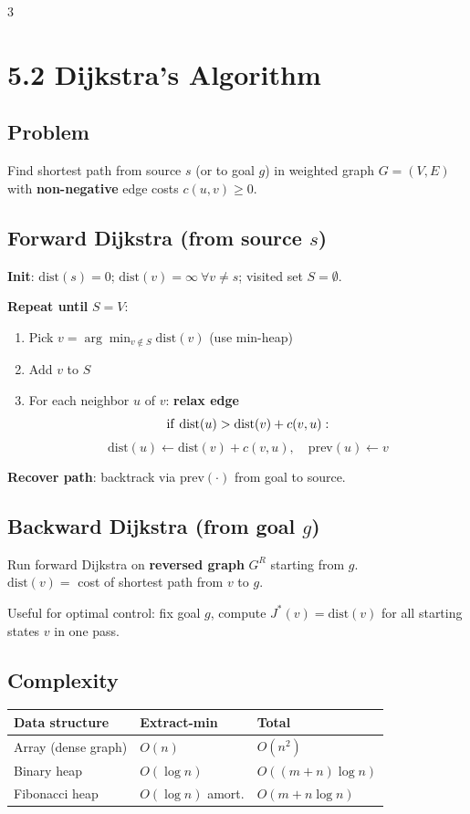 \documentclass[9pt,landscape]{article}
\begin{document}
\begin{multicols}{3}
\section{5.2 Dijkstra's Algorithm}

\subsection{Problem}
Find shortest path from source $s$ (or to goal $g$) in weighted graph $G=(V,E)$ with \textbf{non-negative} edge costs $c(u,v)\ge0$.

\subsection{Forward Dijkstra (from source $s$)}
\textbf{Init}: $\mathrm{dist}(s)=0$; $\mathrm{dist}(v)=\infty\ \forall v\ne s$; visited set $S=\emptyset$.

\textbf{Repeat until} $S=V$:
\begin{enumerate}
  \item Pick $v=\arg\min_{v\notin S}\mathrm{dist}(v)$ \quad (use min-heap)
  \item Add $v$ to $S$
  \item For each neighbor $u$ of $v$: \textbf{relax edge}
  \[{\rm if}\ \mathrm{dist}(u)>\mathrm{dist}(v)+c(v,u):\]
  \[\mathrm{dist}(u)\leftarrow\mathrm{dist}(v)+c(v,u),\quad \mathrm{prev}(u)\leftarrow v\]
\end{enumerate}
\textbf{Recover path}: backtrack via $\mathrm{prev}(\cdot)$ from goal to source.

\subsection{Backward Dijkstra (from goal $g$)}
Run forward Dijkstra on \textbf{reversed graph} $G^R$ starting from $g$.\\
$\mathrm{dist}(v)=$ cost of shortest path from $v$ to $g$.

Useful for optimal control: fix goal $g$, compute $J^*(v)=\mathrm{dist}(v)$ for all starting states $v$ in one pass.

\subsection{Complexity}
\begin{tabular}{@{}lll@{}}
\toprule
\textbf{Data structure} & \textbf{Extract-min} & \textbf{Total}\\
\midrule
Array (dense graph) & $O(n)$ & $O(n^2)$\\
Binary heap & $O(\log n)$ & $O((m+n)\log n)$\\
Fibonacci heap & $O(\log n)$ amort. & $O(m+n\log n)$\\
\bottomrule
\end{tabular}


\end{multicols}
\end{document}
